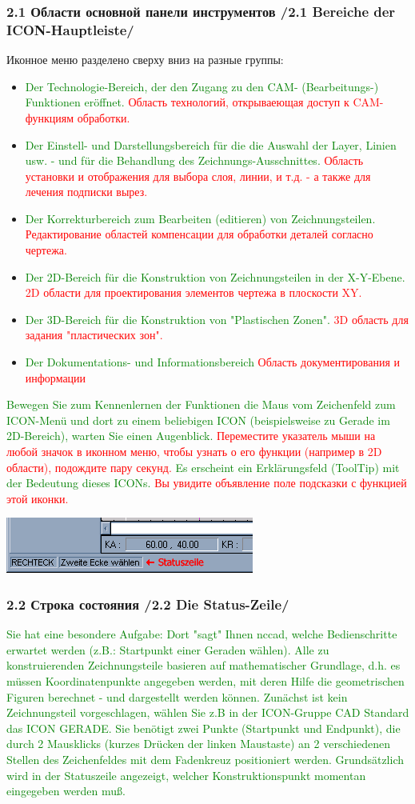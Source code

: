 \documentclass[12pt,a4paper]{book}
\newcommand{\DE}[1]{\textcolor{green}{#1}}
\newcommand{\RU}[1]{\textcolor{red}{#1}}
\newcommand{\TRsubsubsection}[2]{\subsubsection{#2 /#1/}}
\begin{document}
    \TRsubsubsection{2.1 Bereiche der ICON-Hauptleiste}{2.1 Области основной
    панели инструментов}
    
Иконное меню разделено сверху вниз на разные группы:

\begin{itemize}
  \item
\DE{Der Technologie-Bereich, der den Zugang zu den CAM- (Bearbeitungs-)
Funktionen eröffnet.}
\RU{Область технологий, открываеющая доступ к CAM-функциям обработки.}
  \item
\DE{Der Einstell- und Darstellungsbereich für die die Auswahl der Layer, Linien
usw. - und für die Behandlung des Zeichnungs-Ausschnittes.}
\RU{Область установки и отображения для выбора слоя, линии, и т.д. - а также для
лечения подписки вырез.}
  \item
\DE{Der Korrekturbereich zum Bearbeiten (editieren) von Zeichnungsteilen. }
\RU{Редактирование областей компенсации для обработки деталей согласно чертежа.}
  \item
\DE{Der 2D-Bereich für die Konstruktion von Zeichnungsteilen in der X-Y-Ebene. }
\RU{2D области для проектирования элементов чертежа в плоскости XY.}
  \item
\DE{Der 3D-Bereich für die Konstruktion von "Plastischen Zonen". }
\RU{3D область для задания "пластических зон".}
  \item
\DE{Der Dokumentations- und Informationsbereich }
\RU{Область документирования и информации}
\end{itemize}

\DE{Bewegen Sie zum Kennenlernen der Funktionen die Maus vom Zeichenfeld zum
ICON-Menü und dort zu einem beliebigen ICON (beispielsweise zu Gerade im 2D-Bereich), 
warten Sie einen Augenblick.}
\RU{Переместите указатель мыши на любой значок в иконном меню, чтобы узнать
о его функции (например в 2D области), подождите пару секунд.}
\DE{Es erscheint ein Erklärungsfeld (ToolTip) mit der
Bedeutung dieses ICONs.}
\RU{Вы увидите объявление поле подсказки с функцией этой иконки.}
    
\includegraphics{pic/Kons3.png}
    \TRsubsubsection{2.2 Die Status-Zeile}{2.2 Строка состояния}

\DE{Sie hat eine besondere Aufgabe:}
\DE{Dort "sagt" Ihnen nccad, welche Bedienschritte erwartet werden (z.B.:
Startpunkt einer Geraden wählen). }
\DE{Alle zu konstruierenden Zeichnungsteile basieren auf mathematischer
Grundlage, d.h.
es müssen Koordinatenpunkte angegeben werden, mit deren Hilfe die geometrischen 
Figuren berechnet - und dargestellt werden können.}
\DE{Zunächst ist kein Zeichnungsteil 
vorgeschlagen, wählen Sie z.B in der ICON-Gruppe CAD Standard das ICON GERADE.}
\DE{Sie benötigt zwei Punkte (Startpunkt und Endpunkt), die durch 2 Mausklicks (kurzes 
Drücken der linken Maustaste) an 2 verschiedenen Stellen des Zeichenfeldes mit dem
 Fadenkreuz positioniert werden.}
 \DE{Grundsätzlich wird in der Statuszeile angezeigt, 
 welcher Konstruktionspunkt momentan eingegeben werden muß.}
    
\end{document}

